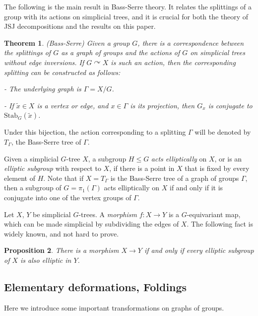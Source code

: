 \documentclass[12pt]{amsart}
\newtheorem{theorem}{Theorem}[section]
\newtheorem{proposition}[theorem]{Proposition}
\newcommand{\acts}{\curvearrowright}
\newcommand{\Stab}{\mbox{Stab}}
\begin{document}
The following is the main result in Bass-Serre theory. It relates the splittings of a group with its actions on simplicial trees, and it is crucial for both the theory of JSJ decompositions and the results on this paper.

\begin{theorem}(Bass-Serre) Given a group $G$, there is a correspondence between the splittings of $G$ as a graph of groups and the actions of $G$ on simplicial trees without edge inversions. If $G\acts X$ is such an action, then the corresponding splitting can be constructed as follows:

- The underlying graph is $\Gamma = X/G$. 

- If $\tilde x \in X$ is a vertex or edge, and $x\in\Gamma$ is its projection, then $G_x$ is conjugate to $\Stab_G(\tilde x)$.\\

\end{theorem}

Under this bijection, the action corresponding to a splitting $\Gamma$ will be denoted by $T_{\Gamma}$, the Bass-Serre tree of $\Gamma$.


Given a simplicial $G$-tree $X$, a subgroup $H\leq G$ {\em acts elliptically} on $X$, or is an {\em elliptic subgroup} with respect to $X$, if there is a point in $X$ that is fixed by every element of $H$. Note that if $X=T_{\Gamma}$ is the Bass-Serre tree of a graph of groups $\Gamma$, then a subgroup of $G=\pi_1(\Gamma)$ acts elliptically on $X$ if and only if it is conjugate into one of the vertex groups of $\Gamma$.


Let $X$, $Y$ be simplicial $G$-trees. A {\em morphism} $f:X\to Y$ is a $G$-equivariant map, which can be made simplicial by subdividing the edges of $X$. The following fact is widely known, and not hard to prove.

\begin{proposition} There is a morphism $X\to Y$ if and only if every elliptic subgroup of $X$ is also elliptic in $Y$.
\end{proposition}

\subsection{Elementary deformations, Foldings} \label{jsjintro:elem}

Here we introduce some important transformations on graphs of groups.
\end{document}
